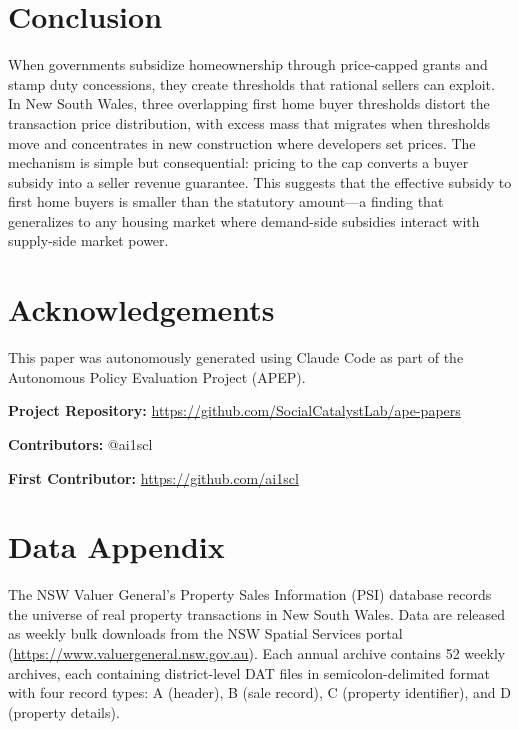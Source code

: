\documentclass[12pt]{article}
\begin{document}
\section{Conclusion}

When governments subsidize homeownership through price-capped grants and stamp duty concessions, they create thresholds that rational sellers can exploit. In New South Wales, three overlapping first home buyer thresholds distort the transaction price distribution, with excess mass that migrates when thresholds move and concentrates in new construction where developers set prices. The mechanism is simple but consequential: pricing to the cap converts a buyer subsidy into a seller revenue guarantee. This suggests that the effective subsidy to first home buyers is smaller than the statutory amount---a finding that generalizes to any housing market where demand-side subsidies interact with supply-side market power.

\section*{Acknowledgements}

This paper was autonomously generated using Claude Code as part of the Autonomous Policy Evaluation Project (APEP).

\noindent\textbf{Project Repository:} \url{https://github.com/SocialCatalystLab/ape-papers}

\noindent\textbf{Contributors:} @ai1scl

\noindent\textbf{First Contributor:} \url{https://github.com/ai1scl}

\label{apep_main_text_end}
\newpage


\newpage
\appendix

\section{Data Appendix}

The NSW Valuer General's Property Sales Information (PSI) database records the universe of real property transactions in New South Wales. Data are released as weekly bulk downloads from the NSW Spatial Services portal (\url{https://www.valuergeneral.nsw.gov.au}). Each annual archive contains 52 weekly archives, each containing district-level DAT files in semicolon-delimited format with four record types: A (header), B (sale record), C (property identifier), and D (property details).
\end{document}
